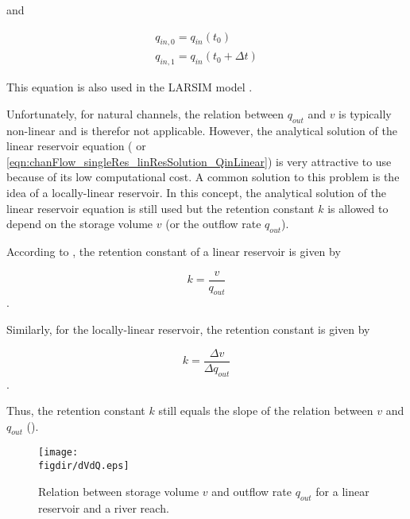 and

\begin{align*}
  q_{in,0} = q_{in}(t_0) \\ \nonumber
  q_{in,1} = q_{in}(t_0 + \Delta t) \nonumber
\end{align*}

This equation is also used in the LARSIM model \citep[same as Equation 3.54 in][]{Ludwig2006}.

Unfortunately, for natural channels, the relation between $q_{out}$ and $v$ is typically non-linear and   is therefor not applicable. However, the analytical solution of the linear reservoir equation ( or \ref{eqn:chanFlow_singleRes_linResSolution_QinLinear}) is very attractive to use because of its low computational cost. A common solution to this problem is the idea of a locally-linear reservoir. In this concept, the analytical solution of the linear reservoir equation is still used but the retention constant $k$ is allowed to depend on the storage volume $v$ (or the outflow rate $q_{out}$).

According to , the retention constant of a linear reservoir is given by 

\begin{equation} \label{eqn:chanFlow_singleRes_retConst_trueLinear}
 k = \frac{v}{q_{out}}
\end{equation}
.

Similarly, for the locally-linear reservoir, the retention constant is given by 

\begin{equation} \label{eqn:chanFlow_singleRes_retConst_locallyLinear}
 k = \frac{\Delta v}{\Delta q_{out}}
\end{equation}
.

Thus, the retention constant $k$ still equals the slope of the relation between $v$ and $q_{out}$  ().

\begin{figure}
  \centering
  \texttt{[image: \\figdir/dVdQ.eps]}
  \caption{Relation between storage volume $v$ and outflow rate $q_{out}$ for a linear reservoir and a river reach. \label{fig:chanFlow_singleRes_dVdQ}}
\end{figure}


